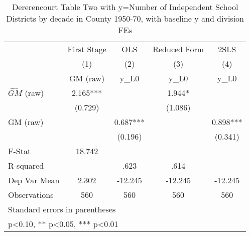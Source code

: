 \begin{table}[htbp]\centering
\def\sym#1{\ifmmode^{#1}\else\(^{#1}\)\fi}
\caption{Dererencourt Table Two with y=Number of Independent School Districts by decade in County 1950-70, with baseline y and division FEs}
\begin{tabular}{l*{4}{c}}
\toprule
                    & First Stage   &         OLS   &Reduced Form   &        2SLS   \\
                    &\multicolumn{1}{c}{(1)}&\multicolumn{1}{c}{(2)}&\multicolumn{1}{c}{(3)}&\multicolumn{1}{c}{(4)}\\
                    &\multicolumn{1}{c}{GM  (raw)}&\multicolumn{1}{c}{y\_L0}&\multicolumn{1}{c}{y\_L0}&\multicolumn{1}{c}{y\_L0}\\
\midrule
$\hat{GM}$ (raw)    &       2.165***&               &       1.944*  &               \\
                    &     (0.729)   &               &     (1.086)   &               \\
\addlinespace
GM  (raw)           &               &       0.687***&               &       0.898***\\
                    &               &     (0.196)   &               &     (0.341)   \\
\midrule
F-Stat              &      18.742   &               &               &               \\
R-squared           &               &        .623   &        .614   &               \\
Dep Var Mean        &       2.302   &     -12.245   &     -12.245   &     -12.245   \\
Observations        &         560   &         560   &         560   &         560   \\
\bottomrule
\multicolumn{5}{l}{\footnotesize Standard errors in parentheses}\\
\multicolumn{5}{l}{\footnotesize * p<0.10, ** p<0.05, *** p<0.01}\\
\end{tabular}
\end{table}
